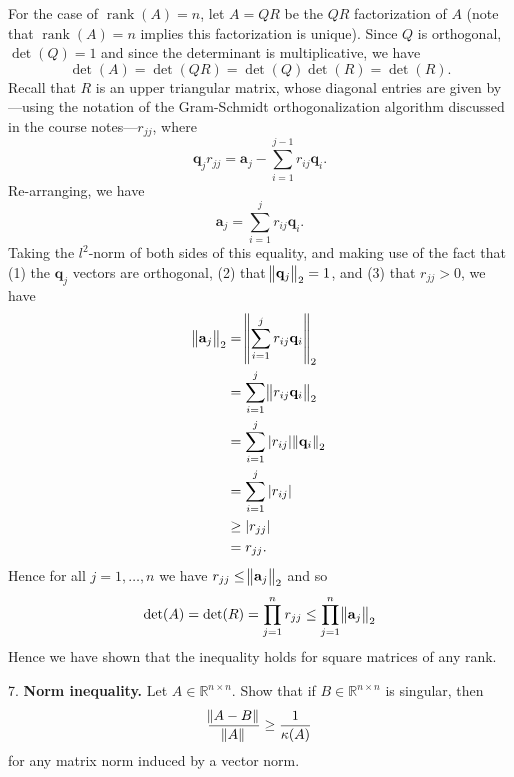 \documentclass{article}
\def\*#1{\mathbf{#1}}
\DeclareMathOperator{\rank}{rank}
\newcommand{\R}{\mathbb{R}}
\begin{document}
For the case of $\rank(A) = n$, let $A = QR$ be the $QR$ factorization of $A$
(note that $\rank(A) = n$ implies this factorization is unique).
Since $Q$ is orthogonal, $\det(Q) = 1$ and since the determinant is multiplicative,
we have
%
\begin{equation*}
    \det(A) = \det(QR) = \det(Q) \det(R) = \det(R)
    .
\end{equation*}
%
Recall that $R$ is an upper triangular matrix, whose diagonal entries are
given by---using the notation of the Gram-Schmidt orthogonalization
algorithm discussed in the course notes---$r_{jj}$, where
%
\begin{equation*}
    \*q_j r_{jj} = \*a_j - \sum_{i = 1}^{j - 1} r_{ij} \*q_i
    .
\end{equation*}
%
Re-arranging, we have
%
\begin{equation*}
    \*a_j = \sum_{i = 1}^{j} r_{ij} \*q_i
    .
\end{equation*}
%
Taking the $l^2$-norm of both sides of this equality, and making
use of the fact that (1) the $\*q_j$ vectors are orthogonal, (2)
that $\enVert{\*q_j}_2 = 1$, and (3) that $r_{jj} > 0$, we have
%
\begin{align*}
    \enVert{\*a_j}_2
        &= \enVert{\sum_{i = 1}^{j} r_{ij} \*q_i}_2 \\
        &= \sum_{i = 1}^{j} \enVert{r_{ij} \*q_i}_2 \\
        &= \sum_{i = 1}^{j} |r_{ij}| \enVert{\*q_i}_2 \\
        &= \sum_{i = 1}^{j} |r_{ij}| \\
        &\geq |r_{jj}| \\
        &= r_{jj}
    .
\end{align*}
%
Hence for all $j = 1, \ldots, n$ we have $r_{jj} \leq \enVert{\*a_j}_2$
and so
%
\begin{equation*}
    \det(A) = \det(R) = \prod_{j = 1}^n r_{jj} \leq \prod_{j = 1}^n \enVert{\*a_j}_2
\end{equation*}
%
Hence we have shown that the inequality holds for square matrices of any rank.

\newpage

7. \textbf{Norm inequality.}
Let $A \in \R^{n \times n}$. Show that if $B \in \R^{n \times n}$ is
singular, then
%
\begin{equation*}
    \frac{\enVert{A - B}}{\enVert{A}} \geq \frac{1}{\kappa(A)}
\end{equation*}
%
for any matrix norm induced by a vector norm.
\end{document}
